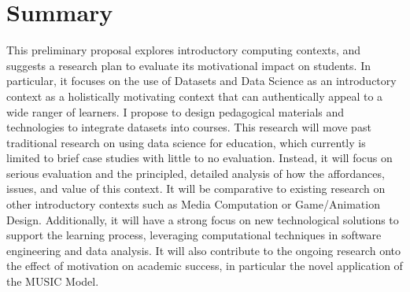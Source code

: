 \section{Summary}

This preliminary proposal explores introductory computing contexts, and suggests a research plan to evaluate its motivational impact on students.
In particular, it focuses on the use of Datasets and Data Science as an introductory context as a holistically motivating context that can authentically appeal to a wide ranger of learners.
I propose to design pedagogical materials and technologies to integrate datasets into courses.
This research will move past traditional research on using data science for education, which currently is limited to brief case studies with little to no evaluation.
Instead, it will focus on serious evaluation and the principled, detailed analysis of how the affordances, issues, and value of this context.
It will be comparative to existing research on other introductory contexts such as Media Computation or Game/Animation Design.
Additionally, it will have a strong focus on new technological solutions to support the learning process, leveraging computational techniques in software engineering and data analysis.
It will also contribute to the ongoing research onto the effect of motivation on academic success, in particular the novel application of the MUSIC Model.

